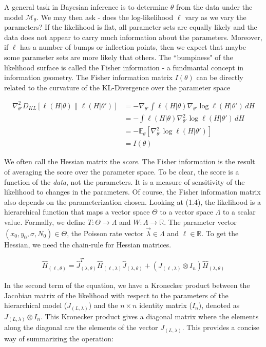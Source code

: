 \documentclass{ucetd}
\begin{document}
A general task in Bayesian inference is to determine $\theta$ from the data under the model $\mathcal{M}_{\theta}$. We may then ask - does the log-likelihood $\ell$ vary as we vary the parameters? If the likelihood is flat, all parameter sets are equally likely and the data does not appear to carry much information about the parameters. Moreover, if $\ell$ has a number of bumps or inflection points, then we expect that maybe some parameter sets are more likely that others. The ``bumpiness" of the likelihood surface is called the Fisher information - a fundmantal concept in information geometry. The Fisher information matrix $I(\theta)$ can be directly related to the curvature of the KL-Divergence over the parameter space

\begin{align*}
\nabla^2_{\theta'} D_{KL}[\ell(H|\theta) \parallel \ell(H|\theta')] 
&= - \nabla_{\theta'} \int \ell(H|\theta) \nabla_{\theta'}  \log \ell(H|\theta') \, dH \\ 
&= - \int \ell(H|\theta) \nabla^2_{\theta'}  \log \ell(H|\theta') \, dH \\
&= - \mathbb{E}_{\theta}[\nabla^2_{\theta'} \log \ell(H|\theta')] \\
&= I(\theta)
\end{align*}


We often call the Hessian matrix the \emph{score}. The Fisher information is the result of averaging the score over the parameter space. To be clear, the score is a function of the \emph{data}, not the parameters. It is a measure of sensitivity of the likelihood to changes in the parameters. Of course, the Fisher information matrix also depends on the parameterization chosen. Looking at (1.4), the likelihood is a hierarchical function that maps a vector space $\Theta$ to a vector space $\Lambda$ to a scalar value. Formally, we define $T: \Theta \rightarrow \Lambda$ and $W: \Lambda \rightarrow \mathbb{R}$. The parameter vector $(x_{0},y_{0},\sigma, N_{0})\in \Theta$, the Poisson rate vector $\vec{\lambda} \in \Lambda$ and $\ell \in \mathbb{R}$. To get the Hessian, we need the chain-rule for Hessian matrices.


\begin{align*}
\hat{H}_{(\ell,\theta)} = \hat{J}_{(\lambda,\theta)}^{T} \hat{H}_{(\ell,\lambda)} \hat{J}_{(\lambda,\theta)} + (J_{(\ell,\lambda)}\otimes I_{n})\hat{H}_{(\lambda,\theta)}
\end{align*}

In the second term of the equation, we have a Kronecker product between the Jacobian matrix of the likelihood with respect to the parameters of the hierarchical model ($J_{(L,\lambda)}$) and the $n\times n$ identity matrix ($I_n$), denoted as $J_{(L,\lambda)}\otimes I_n$. This Kronecker product gives a diagonal matrix where the elements along the diagonal are the elements of the vector $J_{(L,\lambda)}$. This provides a concise way of summarizing the operation:
\end{document}
